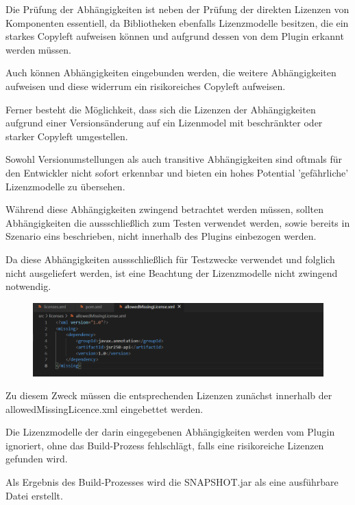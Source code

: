 Die Prüfung der Abhängigkeiten ist neben der Prüfung der direkten Lizenzen von Komponenten essentiell, da Bibliotheken ebenfalls Lizenzmodelle besitzen, die ein starkes Copyleft aufweisen können und aufgrund dessen von dem Plugin erkannt werden müssen. 

Auch können Abhängigkeiten eingebunden werden, die weitere Abhängigkeiten aufweisen und diese widerrum ein risikoreiches Copyleft aufweisen. 

Ferner besteht die Möglichkeit, dass sich die Lizenzen der Abhängigkeiten aufgrund einer Versionsänderung auf ein Lizenmodel mit beschränkter oder starker Copyleft umgestellen.  

Sowohl Versionumstellungen  als auch transitive Abhängigkeiten sind oftmals für den Entwickler nicht sofort erkennbar und bieten ein hohes Potential 'gefährliche' Lizenzmodelle zu übersehen. 

Während diese Abhängigkeiten zwingend betrachtet werden müssen, sollten Abhängigkeiten die aussschließlich zum Testen verwendet werden, sowie bereits in Szenario eins beschrieben, nicht innerhalb des Plugins einbezogen werden. 

Da diese Abhängigkeiten aussschließlich für Testzwecke verwendet und folglich nicht ausgeliefert werden, ist eine Beachtung der Lizenzmodelle nicht zwingend notwendig. 

\begin{figure}[h]
    \centering
    \includegraphics[scale=0.5]{Bilder/allowedmiisingLicence.png}
\end{figure}

Zu diesem Zweck müssen die entsprechenden Lizenzen zunächst innerhalb der allowedMissingLicence.xml eingebettet werden.

Die Lizenzmodelle der darin eingegebenen Abhängigkeiten werden vom Plugin ignoriert, ohne das Build-Prozess fehlschlägt, falls eine risikoreiche Lizenzen gefunden wird. 

Als Ergebnis des Build-Prozesses wird die SNAPSHOT.jar als eine ausführbare Datei erstellt. 
















